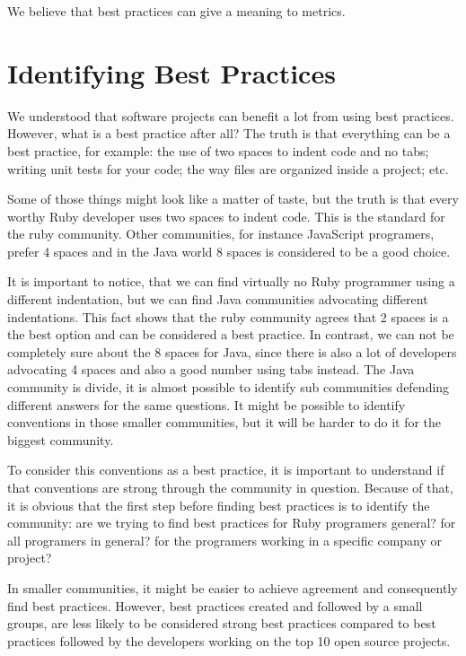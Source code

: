 We believe that best practices can give a meaning to metrics.

\section{Identifying Best Practices} \label{sec:identifying_best_practices}
We understood that software projects can benefit a lot from using best practices.
However, what is a best practice after all?
The truth is that everything can be a best practice, for example:
the use of two spaces to indent code and no tabs; 
writing unit tests for your code;
the way files are organized inside a project; etc.

Some of those things might look like a matter of taste,
but the truth is that every worthy Ruby developer uses two spaces to indent code.
This is the standard for the ruby community. 
Other communities, for instance JavaScript programers, prefer 4 spaces
and in the Java world 8 spaces is considered to be a good choice.

It is important to notice,
that we can find virtually no Ruby programmer using a different indentation, 
but we can find Java communities advocating different indentations.
This fact shows that the ruby community agrees that 2 spaces is a the best option and
can be considered a best practice.
In contrast, we can not be completely sure about the 8 spaces for Java,
since there is also a lot of developers advocating 4 spaces and also a good number using tabs instead.
The Java community is divide, it is almost possible to identify sub communities defending 
different answers for the same questions. 
It might be possible to identify conventions in those smaller communities, 
but it will be harder to do it for the biggest community.

To consider this conventions as a best practice, it is important to understand if that
conventions are strong through the community in question. 
Because of that, it is obvious that the first step before finding best practices is to identify the community:
are we trying to find best practices for Ruby programers general? for all programers in general? 
for the programers working in a specific company or project?

In smaller communities, it might be easier to achieve agreement and
consequently find best practices.
However, best practices created and followed by a small groups,
are less likely to be considered strong best practices compared to 
best practices followed by the developers working on the top 10 open source projects.

